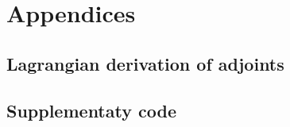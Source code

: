 \documentclass[12pt]{article}
\begin{document}
% 


% 

\newpage
\appendix
\section*{Appendices}
\renewcommand{\thesubsection}{\Alph{subsection}}

\subsection{Lagrangian derivation of adjoints}


\subsection{Supplementaty code}



\newpage

\printbibliography[heading=bibintoc, title={References}]
\end{document}
